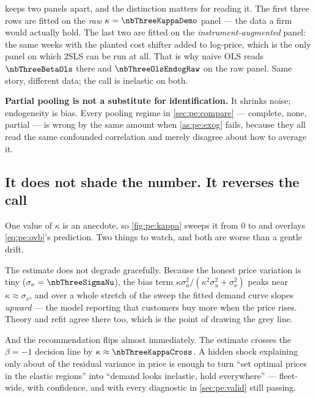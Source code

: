  keeps two panels apart, and the distinction matters for reading it. The first
three rows are fitted on the \emph{raw} $\kappa = \nbThreeKappaDemo$ panel --- the data a firm would
actually hold. The last two are fitted on the \emph{instrument-augmented} panel: the same weeks with
the planted cost shifter added to log-price, which is the only panel on which 2SLS can be run at
all. That is why naive OLS reads $\nbThreeBetaOls$ there and $\nbThreeOlsEndogRaw$ on the raw panel.
Same story, different data; the call is inelastic on both.

\begin{remark}
\textbf{Partial pooling is not a substitute for identification.} It shrinks noise; endogeneity is
bias. Every pooling regime in \cref{sec:pe:compare} --- complete, none, partial --- is wrong by the
same amount when \cref{as:pe:exog} fails, because they all read the same confounded correlation and
merely disagree about how to average it.
\end{remark}

\subsection*{It does not shade the number. It reverses the call}



One value of $\kappa$ is an anecdote, so \cref{fig:pe:kappa} sweeps it from $0$ to
\nbThreeKappaMax{} and overlays \cref{eq:pe:ovb}'s prediction. Two things to watch, and both are
worse than a gentle drift.

The estimate does not degrade gracefully. Because the honest price variation is tiny
($\sigma_\nu = \nbThreeSigmaNu$), the bias term
$\kappa\sigma_u^2/(\kappa^2\sigma_u^2 + \sigma_\nu^2)$ peaks near $\kappa \approx \sigma_\nu$, and
over a whole stretch of the sweep the fitted demand curve slopes \emph{upward} --- the model
reporting that customers buy more when the price rises. Theory and refit agree there too, which is
the point of drawing the grey line.

And the recommendation flips almost immediately. The estimate crosses the $\beta = -1$ decision
line by $\kappa \approx \nbThreeKappaCross$. A hidden shock explaining only about
\pc{\nbThreeKappaCrossShare} of the residual variance in price is enough to turn ``set optimal
prices in the elastic regions'' into ``demand looks inelastic, hold everywhere'' --- fleet-wide,
with confidence, and with every diagnostic in \cref{sec:pe:valid} still passing.

